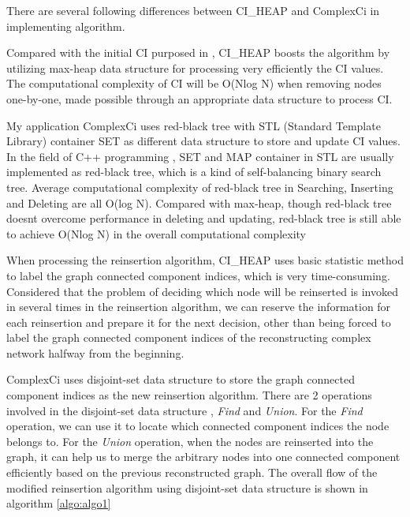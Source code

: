 \documentclass{article}
\begin{document}
	There are several following differences between CI\_HEAP and ComplexCi in implementing algorithm.
	
	\begin{enumerate}
	\begin{item}
		Compared with the initial CI purposed in \cite{morone2015influence}, CI\_HEAP boosts the algorithm by utilizing max-heap data structure for processing very efficiently the CI values. The computational complexity of CI will be O(Nlog N) when removing nodes one-by-one, made possible through an appropriate data structure to process CI. 
		
		My application ComplexCi uses red-black tree with STL (Standard Template Library) container SET as different data structure to store and update CI values. In the field of C++ programming , SET and MAP container in STL are usually implemented as red-black tree, which is a kind of self-balancing binary search tree. Average computational complexity of red-black tree in Searching, Inserting and Deleting are all O(log N). Compared with max-heap, though red-black tree doesn\textquotesingle t overcome performance in deleting and updating, red-black tree is still able to achieve O(Nlog N) in the overall computational complexity 
	\end{item}
	\begin{item}
		When processing the reinsertion algorithm, CI\_HEAP uses basic statistic method to label the graph connected component indices, which is very time-consuming. Considered that the problem of deciding which node will be reinserted is invoked in several times in the reinsertion algorithm, we can reserve the information for each reinsertion and prepare it for the next decision, other than being forced to label the graph connected component indices of the reconstructing complex network halfway from the beginning.
		
		ComplexCi uses disjoint-set data structure to store the graph connected component indices as the new reinsertion algorithm. There are 2 operations involved in the disjoint-set data structure , \textit{Find} and \textit{Union}. For the \textit{Find} operation, we can use it to locate which connected component indices the node belongs to. For the \textit{Union} operation, when the nodes are reinserted into the graph, it can help us to merge the arbitrary nodes into one connected component efficiently based on the previous reconstructed graph. The overall flow of the modified reinsertion algorithm using disjoint-set data structure is shown in algorithm \ref{algo:algo1}


\end{item}
\end{enumerate}
\end{document}
